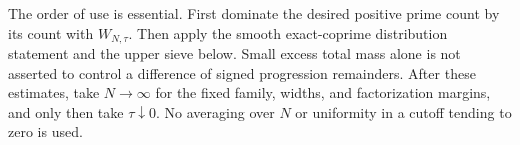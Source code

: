 The order of use is essential. First dominate the desired positive
prime count by its count with $W_{N,\tau}$. Then apply the smooth
exact-coprime distribution statement and the upper sieve below.
Small excess total mass alone is not asserted to control a difference
of signed progression remainders. After these estimates, take
$N\to\infty$ for the fixed family, widths, and factorization margins,
and only then take $\tau\downarrow0$. No averaging over $N$ or
uniformity in a cutoff tending to zero is used.
